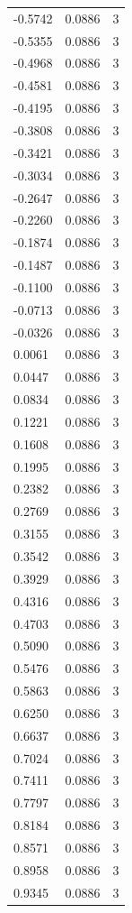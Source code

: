 \begin{longtable}{lrr}
  -0.5742 & 0.0886 & 3 \\
  -0.5355 & 0.0886 & 3 \\
  -0.4968 & 0.0886 & 3 \\
  -0.4581 & 0.0886 & 3 \\
  -0.4195 & 0.0886 & 3 \\
  -0.3808 & 0.0886 & 3 \\
  -0.3421 & 0.0886 & 3 \\
  -0.3034 & 0.0886 & 3 \\
  -0.2647 & 0.0886 & 3 \\
  -0.2260 & 0.0886 & 3 \\
  -0.1874 & 0.0886 & 3 \\
  -0.1487 & 0.0886 & 3 \\
  -0.1100 & 0.0886 & 3 \\
  -0.0713 & 0.0886 & 3 \\
  -0.0326 & 0.0886 & 3 \\
  0.0061 & 0.0886 & 3 \\
  0.0447 & 0.0886 & 3 \\
  0.0834 & 0.0886 & 3 \\
  0.1221 & 0.0886 & 3 \\
  0.1608 & 0.0886 & 3 \\
  0.1995 & 0.0886 & 3 \\
  0.2382 & 0.0886 & 3 \\
  0.2769 & 0.0886 & 3 \\
  0.3155 & 0.0886 & 3 \\
  0.3542 & 0.0886 & 3 \\
  0.3929 & 0.0886 & 3 \\
  0.4316 & 0.0886 & 3 \\
  0.4703 & 0.0886 & 3 \\
  0.5090 & 0.0886 & 3 \\
  0.5476 & 0.0886 & 3 \\
  0.5863 & 0.0886 & 3 \\
  0.6250 & 0.0886 & 3 \\
  0.6637 & 0.0886 & 3 \\
  0.7024 & 0.0886 & 3 \\
  0.7411 & 0.0886 & 3 \\
  0.7797 & 0.0886 & 3 \\
  0.8184 & 0.0886 & 3 \\
  0.8571 & 0.0886 & 3 \\
  0.8958 & 0.0886 & 3 \\
  0.9345 & 0.0886 & 3 \\

\end{longtable}
